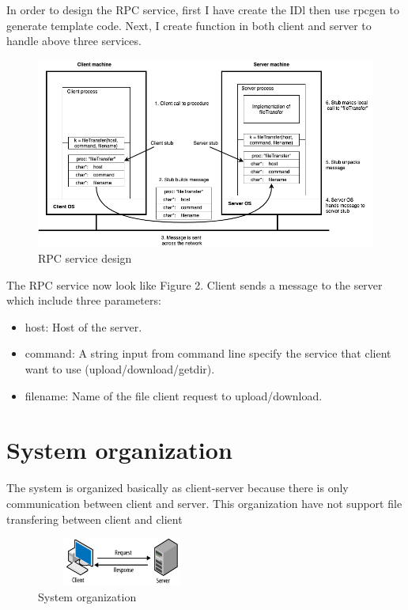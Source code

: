 \documentclass{article}
\begin{document}
In order to design the RPC service, first I have create the IDl then use rpcgen to generate template code. Next, I create function in both client and server to handle above three services.
\newpage
    \begin{figure}[h]
        \centering
        \includegraphics[width=1.2\textwidth]{image/RPCservice.png}
        \caption{RPC service design}
        \label{fig:my_label}
    \end{figure}
The RPC service now look like Figure 2. Client sends a message to the server which include three parameters:
\begin{itemize}
    \item host: Host of the server.
    \item command: A string input from command line specify the service that client want to use (upload/download/getdir).
    \item filename: Name of the file client request to upload/download.
\end{itemize}

\section{System organization}
The system is organized basically as client-server because there is only communication between client and server. This organization have not support file transfering between client and client
    \begin{figure}[h]
        \centering
        \includegraphics[width=0.5\textwidth,height=60px]{image/client-server-1.png}
        \caption{System organization}
        \label{fig:my_label}
    \end{figure}
\newpage
\end{document}
